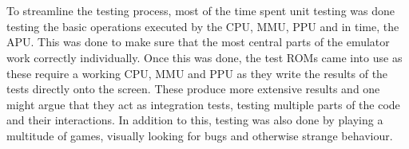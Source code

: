\\\\
To streamline the testing process, most of the time spent unit testing was done testing the basic operations executed by the CPU, MMU, PPU and in time, the APU. This was done to make sure that the most central parts of the emulator work correctly individually. Once this was done, the test ROMs came into use as these require a working CPU, MMU and PPU as they write the results of the tests directly onto the screen. These produce more extensive results and one might argue that they act as integration tests, testing multiple parts of the code and their interactions. In addition to this, testing was also done by playing a multitude of games, visually looking for bugs and otherwise strange behaviour.
